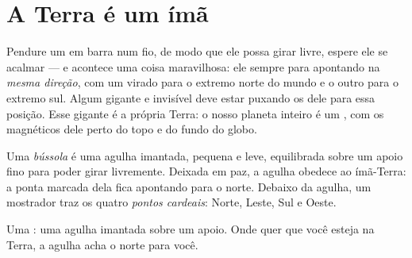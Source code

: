 \section{A Terra é um ímã}

\begin{example}\label{ex:g4:magnets-and-compass:earth}
Pendure um  em barra num fio, de modo que ele possa girar livre,
espere ele se acalmar --- e acontece uma coisa maravilhosa: ele
sempre para apontando na \emph{mesma direção}, com um  virado
para o extremo norte do mundo e o outro para o extremo sul. Algum 
gigante e invisível deve estar puxando os  dele para essa
posição. Esse gigante é a própria Terra: o nosso planeta inteiro é um
, com os  magnéticos dele perto do topo e do fundo do globo.
\end{example}

\begin{definition}[Bússola]\label{def:g4:magnets-and-compass:compass}
Uma \emph{bússola} é uma agulha imantada, pequena e
leve, equilibrada sobre um apoio fino para poder girar livremente.
Deixada em paz, a agulha obedece ao ímã-Terra: a ponta marcada dela
fica apontando para o norte. Debaixo da agulha, um mostrador traz os
quatro \emph{pontos cardeais}: Norte, Leste,
Sul e Oeste.
\end{definition}

\begin{omfigure}

{\small Uma : uma agulha imantada sobre um apoio. Onde quer
que você esteja na Terra, a agulha acha o norte para você.}
\end{omfigure}

